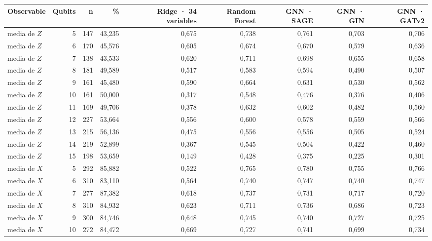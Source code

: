 \begin{table}[htbp]
    \centering
    {\footnotesize
    \begin{tabular}{@{}lrrrrrrrr@{}}
        \toprule
        \textbf{Observable} & \textbf{Qubits} & \textbf{n} & \textbf{\%} & \textbf{Ridge · 34 variables} & \textbf{Random Forest} & \textbf{GNN · SAGE} & \textbf{GNN · GIN} & \textbf{GNN · GATv2} \\
        \midrule
        media de $Z$ & 5 & 147 & 43,235 & 0,675 & 0,738 & 0,761 & 0,703 & 0,706 \\
        media de $Z$ & 6 & 170 & 45,576 & 0,605 & 0,674 & 0,670 & 0,579 & 0,636 \\
        media de $Z$ & 7 & 138 & 43,533 & 0,620 & 0,711 & 0,698 & 0,655 & 0,658 \\
        media de $Z$ & 8 & 181 & 49,589 & 0,517 & 0,583 & 0,594 & 0,490 & 0,507 \\
        media de $Z$ & 9 & 161 & 45,480 & 0,590 & 0,664 & 0,631 & 0,530 & 0,562 \\
        media de $Z$ & 10 & 161 & 50,000 & 0,317 & 0,548 & 0,476 & 0,376 & 0,406 \\
        media de $Z$ & 11 & 169 & 49,706 & 0,378 & 0,632 & 0,602 & 0,482 & 0,560 \\
        media de $Z$ & 12 & 227 & 53,664 & 0,556 & 0,600 & 0,578 & 0,559 & 0,566 \\
        media de $Z$ & 13 & 215 & 56,136 & 0,475 & 0,556 & 0,556 & 0,505 & 0,524 \\
        media de $Z$ & 14 & 219 & 52,899 & 0,367 & 0,545 & 0,504 & 0,422 & 0,460 \\
        media de $Z$ & 15 & 198 & 53,659 & 0,149 & 0,428 & 0,375 & 0,225 & 0,301 \\
        media de $X$ & 5 & 292 & 85,882 & 0,522 & 0,765 & 0,780 & 0,755 & 0,766 \\
        media de $X$ & 6 & 310 & 83,110 & 0,564 & 0,740 & 0,747 & 0,740 & 0,747 \\
        media de $X$ & 7 & 277 & 87,382 & 0,618 & 0,737 & 0,731 & 0,717 & 0,720 \\
        media de $X$ & 8 & 310 & 84,932 & 0,623 & 0,711 & 0,736 & 0,686 & 0,723 \\
        media de $X$ & 9 & 300 & 84,746 & 0,648 & 0,745 & 0,740 & 0,727 & 0,725 \\
        media de $X$ & 10 & 272 & 84,472 & 0,669 & 0,727 & 0,741 & 0,699 & 0,734 \\

\end{tabular}}
\end{table}
